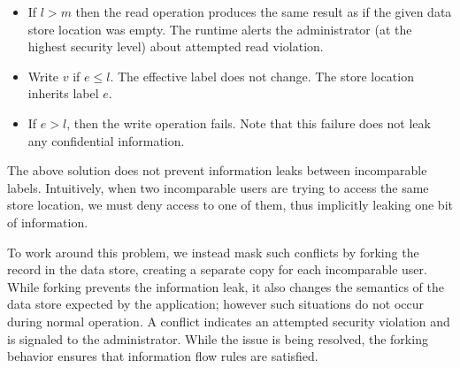 \begin{itemize}
\begin{itemize}
\begin{itemize}
            \item If $l > m$ then the read operation produces the same result as if the given data store location was empty. The runtime alerts the administrator (at the highest security level) about attempted read violation.

            \item Write $v$ if $e \leq l$. The effective label does not change. The store location inherits label $e$.

            \item If $e > l$, then the write operation fails. Note that this failure does not leak any confidential information.
        \end{itemize}
    \end{itemize}
\end{itemize}

The above solution does not prevent information leaks between incomparable labels. Intuitively, when two incomparable users are trying to access the same store location, we must deny access to one of them, thus implicitly leaking one bit of information.

To work around this problem, we instead mask such conflicts by forking the record in the data store, creating a separate copy for each incomparable user. While forking prevents the information leak, it also changes the semantics of the data store expected by the application; however such situations do not occur during normal operation. A conflict indicates an attempted security violation and is signaled to the administrator. While the issue is being resolved, the forking behavior ensures that information flow rules are satisfied.


